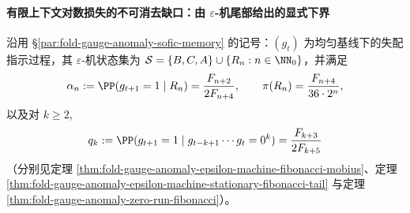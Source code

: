 \paragraph{有限上下文对数损失的不可消去缺口：由 \texorpdfstring{$\varepsilon$}{ε}-机尾部给出的显式下界}\label{par:fold-gauge-anomaly-sofic-memory-logloss}
沿用 \S\ref{par:fold-gauge-anomaly-sofic-memory} 的记号：\((g_t)\) 为均匀基线下的失配指示过程，其 \(\varepsilon\)-机状态集为 \(\mathcal S=\{B,C,A\}\cup\{R_n:n\in\NN_0\}\)，并满足
\[
\alpha_n:=\PP(g_{t+1}=1\mid R_n)=\frac{F_{n+2}}{2F_{n+4}},
\qquad
\pi(R_n)=\frac{F_{n+4}}{36\cdot 2^n},
\]
以及对 \(k\ge 2\),
\[
q_k:=\PP(g_{t+1}=1\mid g_{t-k+1}\cdots g_t=0^k)=\frac{F_{k+3}}{2F_{k+5}}
\]
（分别见定理 \ref{thm:fold-gauge-anomaly-epsilon-machine-fibonacci-mobius}、定理 \ref{thm:fold-gauge-anomaly-epsilon-machine-stationary-fibonacci-tail} 与定理 \ref{thm:fold-gauge-anomaly-zero-run-fibonacci}）。

